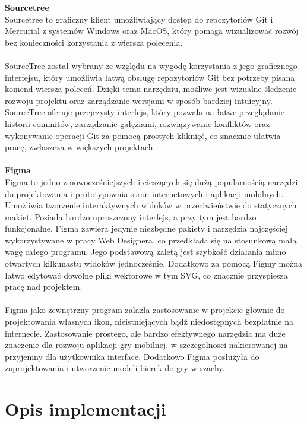\documentclass[12pt,a4paper]{article}
\begin{document}
\noindent \textbf{Sourcetree}\\
Sourcetree to graficzny klient umożliwiający dostęp do repozytoriów Git i Mercurial z systemów Windows oraz MacOS, który pomaga wizualizować rozwój bez konieczności korzystania z wiersza polecenia.
\\\\
SourceTree został wybrany ze względu na wygodę korzystania z jego graficznego interfejsu, który umożliwia łatwą obsługę repozytoriów Git bez potrzeby pisana komend wiersza poleceń. Dzięki temu narzędziu, możliwe jest wizualne śledzenie rozwoju projektu oraz zarządzanie wersjami w sposób bardziej intuicyjny. SourceTree oferuje przejrzysty interfejs, który pozwala na łatwe przeglądanie historii commitów, zarządzanie gałęziami, rozwiązywanie konfliktów oraz wykonywanie operacji Git za pomocą prostych kliknięć, co znacznie ułatwia pracę, zwłaszcza w większych projektach
\\\\

\noindent \textbf{Figma}\\
Figma to jedno z nowocześniejszych i cieszących się dużą popularnością narzędzi do projektowania i prototypownia stron internetowych i aplikacji mobilnych. Umożliwia tworzenie interaktywnych widoków w przeciwieństwie do statycznych makiet. Posiada bardzo uproszczony interfejs, a przy tym jest bardzo funkcjonalne. Figma zawiera jedynie niezbędne pakiety i narzędzia najczęściej wykorzystywane w pracy Web Designera, co przedkłada się na stosunkową małą wagę całego programu. Jego podstawową zaletą jest szybkość działania mimo otwartych kilkunastu widoków jednocześnie. Dodatkowo za pomocą Figmy można łatwo edytować dowolne pliki wektorowe w tym SVG, co znacznie przyspiesza pracę nad projektem.
\\\\
Figma jako zewnętrzny program zalazła zastosowanie w projekcie głownie do projektowania własnych ikon, nieistniejących bądź niedostępnych bezpłatnie na internecie. Zastosowanie prostego, ale bardzo efektywnego narzędzia ma duże znaczenie dla rozwoju aplikacji gry mobilnej, w szczegolnosci nakierowanej na przyjemny dla użytkownika interface. Dodatkowo Figma posłużyła do zaprojektowania i utworzenie modeli bierek do gry w szachy.  

\newpage

\section{Opis implementacji}
\end{document}
